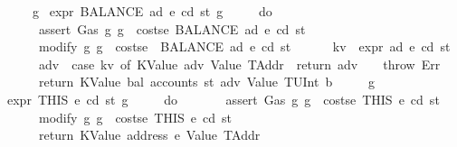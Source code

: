 \begin{isabellebody}
\ \ \ \ {\isacharbraceright}{\kern0pt}{\isacharparenright}{\kern0pt}\ g{\isachardoublequoteclose}\isanewline
{\isacharbar}{\kern0pt}\ {\isachardoublequoteopen}expr\ {\isacharparenleft}{\kern0pt}BALANCE\ ad{\isacharparenright}{\kern0pt}\ e\ cd\ st\ g\ {\isacharequal}{\kern0pt}\isanewline
\ \ \ \ {\isacharparenleft}{\kern0pt}do\ {\isacharbraceleft}{\kern0pt}\isanewline
\ \ \ \ \ \ assert\ Gas\ {\isacharparenleft}{\kern0pt}{\isasymlambda}g{\isachardot}{\kern0pt}\ g\ {\isachargreater}{\kern0pt}\ costs\isactrlsub e\ {\isacharparenleft}{\kern0pt}BALANCE\ ad{\isacharparenright}{\kern0pt}\ e\ cd\ st{\isacharparenright}{\kern0pt}{\isacharsemicolon}{\kern0pt}\isanewline
\ \ \ \ \ \ modify\ {\isacharparenleft}{\kern0pt}{\isasymlambda}g{\isachardot}{\kern0pt}\ g\ {\isacharminus}{\kern0pt}\ costs\isactrlsub e\ \ {\isacharparenleft}{\kern0pt}BALANCE\ ad{\isacharparenright}{\kern0pt}\ e\ cd\ st{\isacharparenright}{\kern0pt}{\isacharsemicolon}{\kern0pt}\isanewline
\ \ \ \ \ \ kv\ {\isasymleftarrow}\ expr\ ad\ e\ cd\ st{\isacharsemicolon}{\kern0pt}\isanewline
\ \ \ \ \ \ adv\ {\isasymleftarrow}\ case\ kv\ of\ {\isacharparenleft}{\kern0pt}KValue\ adv{\isacharcomma}{\kern0pt}\ Value\ TAddr{\isacharparenright}{\kern0pt}\ {\isasymRightarrow}\ return\ adv\ {\isacharbar}{\kern0pt}\ {\isacharunderscore}{\kern0pt}\ {\isasymRightarrow}\ throw\ Err{\isacharsemicolon}{\kern0pt}\ \isanewline
\ \ \ \ \ \ return\ {\isacharparenleft}{\kern0pt}KValue\ {\isacharparenleft}{\kern0pt}bal\ {\isacharparenleft}{\kern0pt}{\isacharparenleft}{\kern0pt}accounts\ st{\isacharparenright}{\kern0pt}\ adv{\isacharparenright}{\kern0pt}{\isacharparenright}{\kern0pt}{\isacharcomma}{\kern0pt}\ Value\ {\isacharparenleft}{\kern0pt}TUInt\ b{}{}{}{\isacharparenright}{\kern0pt}{\isacharparenright}{\kern0pt}\isanewline
\ \ \ \ {\isacharbraceright}{\kern0pt}{\isacharparenright}{\kern0pt}\ g{\isachardoublequoteclose}\isanewline
{\isacharbar}{\kern0pt}\ {\isachardoublequoteopen}expr\ THIS\ e\ cd\ st\ g\ {\isacharequal}{\kern0pt}\isanewline
\ \ \ \ {\isacharparenleft}{\kern0pt}do\ {\isacharbraceleft}{\kern0pt}\isanewline
\ \ \ \ \ \ assert\ Gas\ {\isacharparenleft}{\kern0pt}{\isasymlambda}g{\isachardot}{\kern0pt}\ g\ {\isachargreater}{\kern0pt}\ costs\isactrlsub e\ THIS\ e\ cd\ st{\isacharparenright}{\kern0pt}{\isacharsemicolon}{\kern0pt}\isanewline
\ \ \ \ \ \ modify\ {\isacharparenleft}{\kern0pt}{\isasymlambda}g{\isachardot}{\kern0pt}\ g\ {\isacharminus}{\kern0pt}\ costs\isactrlsub e\ THIS\ e\ cd\ st{\isacharparenright}{\kern0pt}{\isacharsemicolon}{\kern0pt}\isanewline
\ \ \ \ \ \ return\ {\isacharparenleft}{\kern0pt}KValue\ {\isacharparenleft}{\kern0pt}address\ e{\isacharparenright}{\kern0pt}{\isacharcomma}{\kern0pt}\ Value\ TAddr{\isacharparenright}{\kern0pt}\isanewline

\end{isabellebody}
